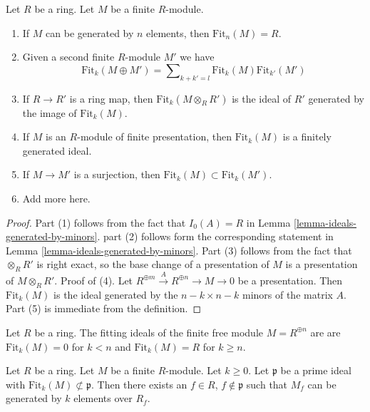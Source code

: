 \begin{lemma}
\label{lemma-fitting-ideal-basics}
Let $R$ be a ring. Let $M$ be a finite $R$-module.
\begin{enumerate}
\item If $M$ can be generated by $n$ elements, then
$\text{Fit}_n(M) = R$.
\item Given a second finite $R$-module $M'$ we have
$$
\text{Fit}_k(M \oplus M') =
\sum\nolimits_{k + k' = l} \text{Fit}_k(M)\text{Fit}_{k'}(M')
$$
\item If $R \to R'$ is a ring map, then $\text{Fit}_k(M \otimes_R R')$
is the ideal of $R'$ generated by the image of $\text{Fit}_k(M)$.
\item If $M$ is an $R$-module of finite presentation, then $\text{Fit}_k(M)$
is a finitely generated ideal.
\item If $M \to M'$ is a surjection, then
$\text{Fit}_k(M) \subset \text{Fit}_k(M')$.
\item Add more here.
\end{enumerate}
\end{lemma}

\begin{proof}
Part (1) follows from the fact that $I_0(A) = R$ in
Lemma \ref{lemma-ideals-generated-by-minors}.
part (2) follows form the corresponding statement in
Lemma \ref{lemma-ideals-generated-by-minors}.
Part (3) follows from the fact that $\otimes_R R'$ is right exact,
so the base change of a presentation of $M$ is a presentation of
$M \otimes_R R'$.
Proof of (4). Let $R^{\oplus m} \xrightarrow{A} R^{\oplus n} \to M \to 0$
be a presentation. Then $\text{Fit}_k(M)$ is the ideal generated by the
$n - k \times n - k$ minors of the matrix $A$.
Part (5) is immediate from the definition.
\end{proof}

\begin{example}
\label{example-fitting-free}
Let $R$ be a ring.
The fitting ideals of the finite free module $M = R^{\oplus n}$ are
are $\text{Fit}_k(M) = 0$ for $k < n$ and $\text{Fit}_k(M) = R$
for $k \geq n$.
\end{example}

\begin{lemma}
\label{lemma-fitting-ideal-generate-locally}
Let $R$ be a ring. Let $M$ be a finite $R$-module. Let $k \geq 0$.
Let $\mathfrak p$ be a prime ideal with
$\text{Fit}_k(M) \not \subset \mathfrak p$. Then there exists
an $f \in R$, $f \not \in \mathfrak p$ such that $M_f$ can be
generated by $k$ elements over $R_f$.
\end{lemma}

